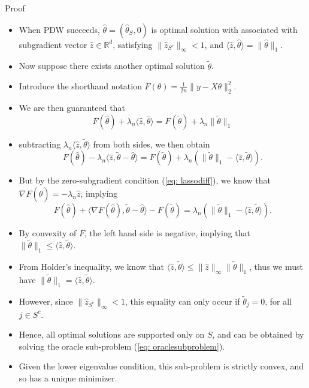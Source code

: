 \documentclass[10pt,handout,english]{beamer}
\newcommand{\R}{\mathbb{R}}
\begin{document}
\begin{frame}[allowframebreaks]{Proof}
\begin{itemize}
\item When PDW succeeds, $\hat{\theta}=(\hat{\theta}_S,0)$ is optimal solution with associated with subgradient vector $\hat{z}\in\R^d$, satisfying $\lVert\hat{z}_{S^c}\rVert_{\infty}<1$, and $\langle\hat{z},\hat{\theta} \rangle=\lVert\hat{\theta}\rVert_1$.\justifying
\item Now suppose there exists another optimal solution $\tilde{\theta}$.\justifying
\item Introduce the shorthand notation $F(\theta)=\frac{1}{2n}\lVert y-X\theta\rVert_2^2$. \justifying
\item We are then guaranteed that\justifying 
\[
F(\hat{\theta})+\lambda_n\langle\hat{z},\hat{\theta} \rangle=F(\tilde{\theta})+\lambda_n\lVert\tilde{\theta}\rVert_1
\]
\item subtracting $\lambda_n\langle \hat{z}, \tilde{\theta}\rangle$ from both sides, we then obtain\justifying
\[
F(\hat{\theta})-\lambda_n\langle\hat{z},\tilde{\theta}-\hat{\theta} \rangle=F(\tilde{\theta})+\lambda_n\left(\lVert\tilde{\theta}\rVert_1-\langle\hat{z},\tilde{\theta}\rangle\right).
\]
\item But by the zero-subgradient condition (\ref{eq: lassodiff}), we know that $\nabla F(\hat{\theta})=-\lambda_n\hat{z}$, implying\justifying
\[
F(\hat{\theta})+\langle\nabla F(\hat{\theta}),\tilde{\theta}-\hat{\theta} \rangle-F(\tilde{\theta})=\lambda_n\left(\lVert\tilde{\theta}\rVert_1-\langle\hat{z},\tilde{\theta}\rangle\right).
\]
\item By convexity of $F$, the left hand side is negative, implying that $\lVert\tilde{\theta}\rVert_1\leq\langle\hat{z},\tilde{\theta}\rangle$.\justifying
\item From Holder's inequality, we know that $\langle\hat{z},\tilde{\theta} \rangle\leq\lVert\hat{z}\rVert_{\infty}\lVert\tilde{\theta}\rVert_1$, thus we must have $\lVert\tilde{\theta}\rVert_1=\langle\hat{z},\tilde{\theta}\rangle$.\justifying
\item However, since $\lVert\hat{z}_{S^c}\rVert_{\infty}<1$, this equality can only occur if $\tilde{\theta}_j=0$, for all $j\in S^c$.\justifying
\item Hence, all optimal solutions are supported only on $S$, and can be obtained by solving the oracle sub-problem (\ref{eq: oraclesubproblem}).\justifying
\item Given the lower eigenvalue condition, this sub-problem is strictly convex, and so has a unique minimizer.\justifying

\end{itemize}
\end{frame}
\end{document}
